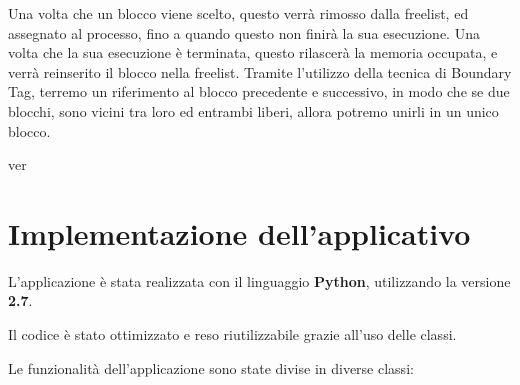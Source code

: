 \documentclass[20pt,a4paper,oneside]{article}
\begin{document}
Una volta che un blocco viene scelto, questo verrà rimosso dalla freelist, ed assegnato al processo, fino a quando questo non finirà la sua esecuzione. Una volta che la sua esecuzione è terminata, questo rilascerà la memoria occupata, e verrà reinserito il blocco nella freelist. \newpage
Tramite l'utilizzo della tecnica di Boundary Tag, terremo un riferimento al blocco precedente e successivo, in modo che se due blocchi, sono vicini tra loro ed entrambi liberi, allora potremo unirli in un unico blocco.

ver\section{Implementazione dell'applicativo}
L'applicazione è stata realizzata con il linguaggio \textbf{Python}, utilizzando la versione \textbf{2.7}.\par
Il codice è stato ottimizzato e reso riutilizzabile grazie all'uso delle classi. \par
Le funzionalità dell'applicazione sono state divise in diverse classi:
\end{document}
